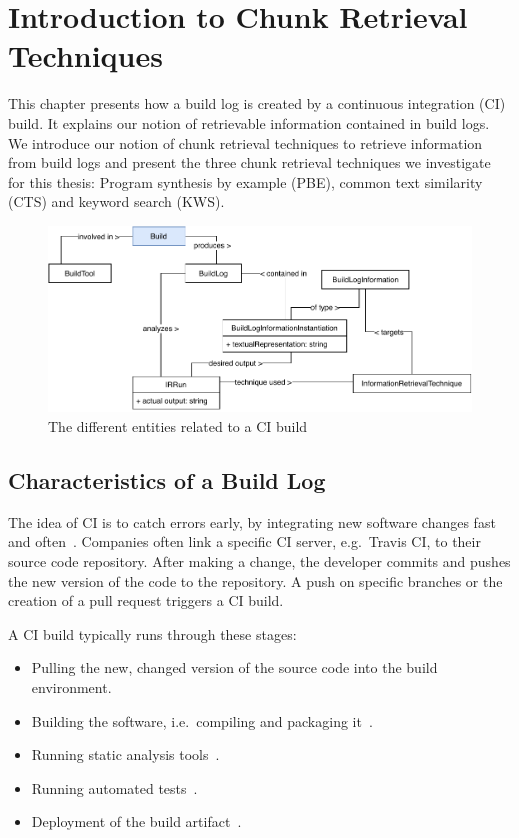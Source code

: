 \documentclass[\myrootdir/main.tex]{subfiles}
\begin{document}
\chapter{Introduction to Chunk Retrieval Techniques}
\label{sec:techniques}
This chapter presents how a build log is created by a continuous integration (CI) build.
It explains our notion of retrievable information contained in build logs.
We introduce our notion of chunk retrieval techniques to retrieve information from build logs and present the three chunk retrieval techniques we investigate for this thesis:
Program synthesis by example (PBE), common text similarity (CTS) and keyword search (KWS).

\begin{figure}[htbp]
	\centering
	\includegraphics[width=\textwidth, clip]{img/build-overview.pdf}
	\caption{The different entities related to a CI build}
	\label{fig:build-overview}
\end{figure}

\section{Characteristics of a Build Log}
\label{sec:bl-characteristics}
The idea of CI is to catch errors early, by integrating new software changes fast and often~\cite{humble2010continuous}.
Companies often link a specific CI server, e.g.\ Travis CI, to their source code repository.
After making a change, the developer commits and pushes the new version of the code to the repository.
A push on specific branches or the creation of a pull request triggers a CI build.

A CI build typically runs through these stages:
\begin{itemize}
	\item Pulling the new, changed version of the source code into the build environment.
	\item Building the software, i.e.\ compiling and packaging it~\cite{phillips2014understanding}.
	\item Running static analysis tools~\cite{zampetti2017open}.
	\item Running automated tests~\cite{beller2017oops}.
	\item Deployment of the build artifact~\cite{schermann2016empirical}.
\end{itemize}
\end{document}
